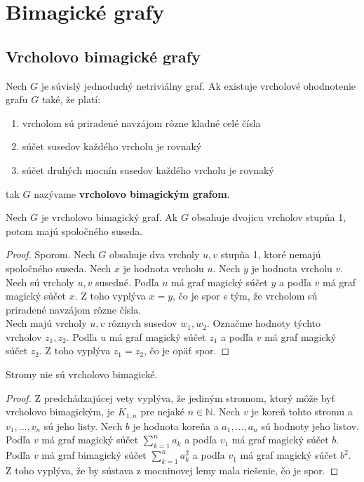 \section{Bimagické grafy}

\subsection{Vrcholovo bimagické grafy}

\begin{definition} Nech $G$ je súvislý jednoduchý netriviálny graf. Ak existuje vrcholové ohodnotenie grafu $G$ také, že platí:
\begin{enumerate}
\item vrcholom sú priradené navzájom rôzne kladné celé čísla
\item súčet susedov každého vrcholu je rovnaký
\item súčet druhých mocnín susedov každého vrcholu je rovnaký
\end{enumerate}
tak $G$ nazývame \textbf{vrcholovo bimagickým grafom}.
\end{definition}

\begin{theorem}
\label{vbgdegree1}
Nech $G$ je vrcholovo bimagický graf. Ak $G$ obsahuje dvojicu vrcholov stupňa 1, potom majú spoločného suseda.
\end{theorem}

\begin{proof} Sporom. Nech $G$ obsahuje dva vrcholy $u,v$ stupňa 1, ktoré nemajú spoločného suseda. Nech $x$ je hodnota vrcholu $u$. Nech $y$ je hodnota vrcholu $v$. \\

Nech sú vrcholy $u,v$ susedné. Podľa $u$ má graf magický súčet $y$ a podľa $v$ má graf magický súčet $x$. Z toho vyplýva $x = y$, čo je spor s tým, že vrcholom sú priradené navzájom rôzne čísla. \\

Nech majú vrcholy $u,v$ rôznych susedov $w_1, w_2$. Označme hodnoty týchto vrcholov $z_1, z_2$. Podľa $u$ má graf magický súčet $z_1$ a podľa $v$ má graf magický súčet $z_2$. Z toho vyplýva $z_1 = z_2$, čo je opäť spor.
\end{proof} 

\begin{consequence} Stromy nie sú vrcholovo bimagické.
\end{consequence}

\begin{proof} Z predchádzajúcej vety vyplýva, že jediným stromom, ktorý môže byť vrcholovo bimagickým, je $K_{1,n}$ pre nejaké $n \in \mathbb{N}$. Nech $v$ je koreň tohto stromu a $v_1, ... , v_n$ sú jeho listy. Nech $b$ je hodnota koreňa a $a_1, ... , a_n$ sú hodnoty jeho listov. Podľa $v$ má graf magický súčet $\sum_{k=1}^{n} a_k$ a podľa $v_1$ má graf magický súčet $b$. Podľa $v$ má graf bimagický súčet $\sum_{k=1}^{n} a_k^2$ a podľa $v_1$ má graf magický súčet $b^2$. Z toho vyplýva, že by sústava z mocninovej lemy mala riešenie, čo je spor.
\end{proof} 

